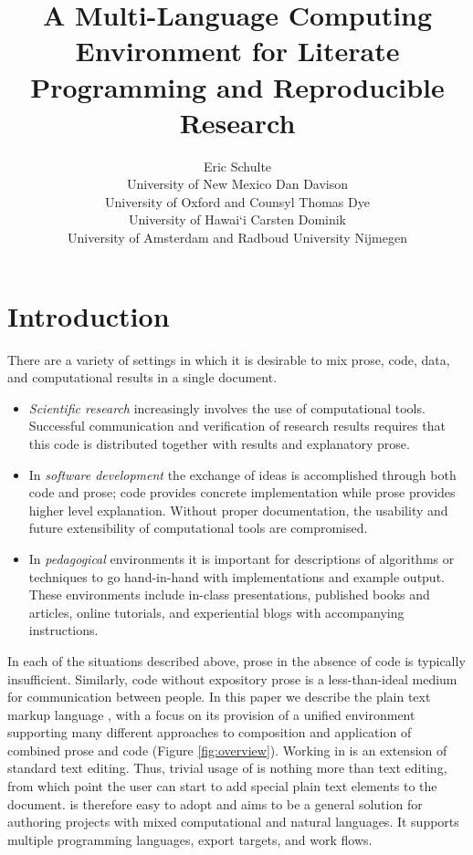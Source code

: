 \documentclass[article,shortnames]{jss}
\author{Eric Schulte\\University of New Mexico \And Dan Davison\\University of Oxford and Counsyl \AND Thomas Dye\\University of Hawai`i \AND Carsten Dominik\\University of Amsterdam and Radboud University Nijmegen}
\title{A Multi-Language Computing Environment for Literate Programming and Reproducible Research}
\begin{document}
\section{Introduction}
\label{sec-1}

There are a variety of settings in which it is desirable to mix prose,
code, data, and computational results in a single document.
\begin{itemize}
\item \emph{Scientific research} increasingly involves the use of computational
  tools. Successful communication and verification of research results
  requires that this code is distributed together with results and
  explanatory prose.
\item In \emph{software development} the exchange of ideas is accomplished
  through both code and prose; code provides concrete implementation
  while prose provides higher level explanation.  Without proper
  documentation, the usability and future extensibility of
  computational tools are compromised.
\item In \emph{pedagogical} environments it is important for descriptions of
  algorithms or techniques to go hand-in-hand with
  implementations and example output.  These environments include
  in-class presentations, published books and articles, online
  tutorials, and experiential blogs with accompanying instructions.
\end{itemize}

In each of the situations described above, prose in the absence
of code is typically insufficient.  Similarly, code
without expository prose is a less-than-ideal medium for communication
between people. In this paper we describe the plain text markup
language , with a focus on its provision of a unified
environment supporting many different approaches to composition and
application of combined prose and code (Figure \ref{fig:overview}).  Working in
 is an extension of standard text editing. Thus, trivial usage
of  is nothing more than text editing, from which point the
user can start to add special plain text 
elements to the document.   is therefore easy to adopt and
aims to be a general solution for authoring projects with mixed
computational and natural languages.  It supports multiple programming languages,
export targets, and work flows.
\end{document}
